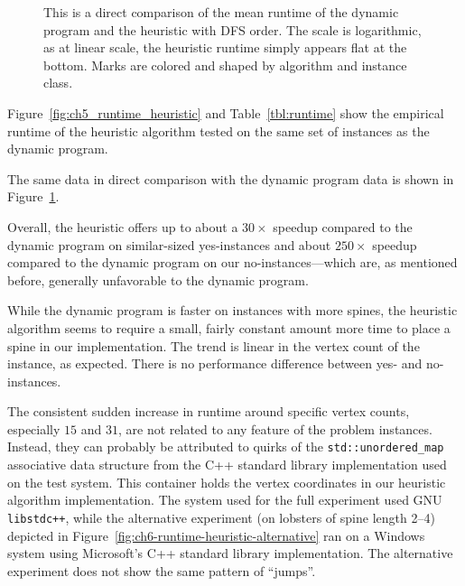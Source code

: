 \begin{figure}
    \centering %
    \scalebox{1}{}
    \caption{This is a direct comparison of the mean runtime of the dynamic program and the heuristic with DFS order. The scale is logarithmic, as at linear scale, the heuristic runtime simply appears flat at the bottom. Marks are colored and shaped by algorithm and instance class.}
    \label{fig:ch6-runtime-dp-vs-h}
\end{figure}

Figure~\ref{fig:ch5_runtime_heuristic} and Table~\ref{tbl:runtime} show the empirical runtime of the heuristic algorithm tested on the same set of instances as the dynamic program.

The same data in direct comparison with the dynamic program data is shown in Figure~\ref{fig:ch6-runtime-dp-vs-h}.

Overall, the heuristic offers up to about a $30\times$ speedup compared to the dynamic program on similar-sized yes-instances and about $250\times$ speedup compared to the dynamic program on our no-instances---which are, as mentioned before, generally unfavorable to the dynamic program.

While the dynamic program is faster on instances with more spines, the heuristic algorithm seems to require a small, fairly constant amount more time to place a spine in our implementation. The trend is linear in the vertex count of the instance, as expected. There is no performance difference between yes- and no-instances.

The consistent sudden increase in runtime around specific vertex counts, especially $15$ and $31$, are not related to any feature of the problem instances. Instead, they can probably be attributed to quirks of the \texttt{std::unordered\_map} associative data structure from the C++ standard library implementation used on the test system. This container holds the vertex coordinates in our heuristic algorithm implementation. The system used for the full experiment used GNU \texttt{libstdc++}, while the alternative experiment (on lobsters of spine length 2--4) depicted in Figure~\ref{fig:ch6-runtime-heuristic-alternative} ran on a Windows system using Microsoft's C++ standard library implementation. The alternative experiment does not show the same pattern of ``jumps''.

